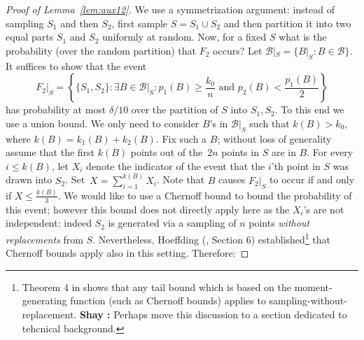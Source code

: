 \documentclass{article}
\def\B{{\mathcal B}}
\newcommand{\samp}{S}
\newcommand{\comment}[3]{{\color{#1} {\bf #2 :} #3}}
\newcommand{\shay}[1]{\comment{purple}{Shay}{#1}}
\newcommand{\yoav}[1]{\comment{green}{Yoav}{#1}}
\begin{document}
\begin{proof}[Proof of Lemma~\ref{lem:aux12}]
We use a symmetrization argument: instead of sampling $\samp_1$ and then $\samp_2$,
	first sample $\samp=\samp_1\cup \samp_2$ and then partition it into two equal parts 
	$\samp_1$ and $\samp_2$ uniformly at random.
	Now, for a fixed $\samp$ what is the probability (over the random partition) that $F_2$ occurs?
	Let $\B|_{\samp} = \{B|_{\samp} : B\in\B\}$.
	It suffices to show that the event
\[F_2|_{\samp} = 
\left\{ \{S_1,S_2\}:
\exists {B\in\B|_{\samp}}:
  p_{1}(B)\geq \frac{k_0}{n} \mbox{ and } p_{2}(B) < \frac{p_{1}(B)}{2}
  \right\}
\]
has probability at most $\delta/10$ over the partition of $\samp$ into $\samp_1,\samp_2$.
To this end we use a union bound. 
	We only need to consider $B$'s in $\B|_{\samp}$ such that $k(B) > k_0$, where $k(B) = k_{1}(B)+ k_{2}(B)$. 
	Fix such a $B$; without loss of generality assume that the first $k(B)$ points 
	out of the~$2n$ points in $S$ are in $B$. 	For every $i\leq k(B)$, let $X_i$ denote 
	the indicator of the event that the $i$'th point in $S$ was drawn into $S_2$.
	Set~$X=\sum_{i=1}^{k(B)}X_i$.
	Note that $B$ causes $F_2|_{\samp}$ to occur if and only if $X\leq \frac{k(B)}{3}$.
	We would like to use a Chernoff bound to bound the probability of this event; 
	however this bound does not directly apply here as the $X_i$'s are not independent:
	indeed $S_2$ is generated via a sampling of $n$ points {\it without replacements} from $S$.
	Nevertheless, Hoeffding (\cite{H63}, Section 6) established\footnote{Theorem 4 in \cite{H63} shows 
	that any tail bound which is based on the moment-generating function (such as Chernoff bounds) applies to sampling-without-		replacement. \shay{Perhaps move this discussion to a section dedicated to tehcnical background.}} that Chernoff bounds apply also in this setting. Therefore:

\end{proof}
\end{document}
